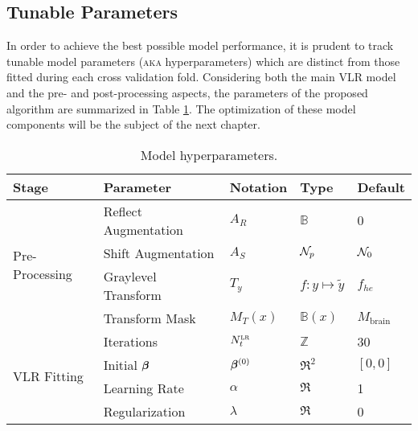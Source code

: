 \subsection{Tunable Parameters}
In order to achieve the best possible model performance, it is prudent to track tunable model parameters (\textsc{aka} hyperparameters) which are distinct from those fitted during each cross validation fold. Considering both the main VLR model and the pre- and post-processing aspects, the parameters of the proposed algorithm are summarized in Table \ref{tab:hyperparams}. The optimization of these model components will be the subject of the next chapter. 
\begin{table}
  \centering
  \caption{Model hyperparameters.}
  \label{tab:hyperparams}
  \begin{tabular}{lllll}
    \hline
    Stage                            & Parameter            & Notation                    & Type                                          & Default                   \\ \hline
    \multirow{4}{*}{Pre-Processing}  & Reflect Augmentation & $A_R$                       & $\mathbb{B}$                                  & 0                         \\
                                     & Shift Augmentation   & $A_S$                       & $\mathcal{N}_p$                                        & $\mathcal{N}_0$                    \\
                                     & Graylevel Transform  & $T_y$                       & $f: y\mapsto \tilde{y}$                       & $f_{he}$                  \\
                                     & Transform Mask       & $M_{T}(x)$                  & $\mathbb{B}(x)$                               & $M_{\text{brain}}$        \\ \hline
    \multirow{6}{*}{VLR Fitting}     & Iterations           & $N_{t}^{\textsc{lr}}$               & $\mathbb{Z}$                                  & 30                        \\
                                     & Initial $\bm{\beta}$        & $\bm{\beta}^{(0)}$                 & $\Re^2$                                       & $[0,0]$                   \\
                                     & Learning Rate        & $\alpha$                    & $\Re$                                         & 1                         \\
                                     & Regularization       & $\lambda$                   & $\Re$                                         & 0                         \\

\end{tabular}
\end{table}
